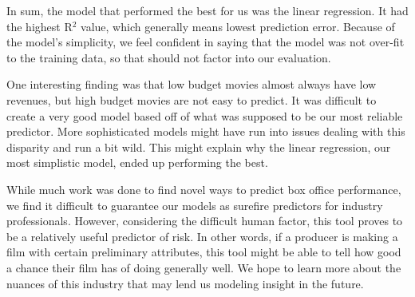 \documentclass{article}
\begin{document}
In sum, the model that performed the best for us was the linear regression. It had the highest R$^2$ value, which generally means lowest prediction error. Because of the model’s simplicity, we feel confident in saying that the model was not over-fit to the training data, so that should not factor into our evaluation.

One interesting finding was that low budget movies almost always have low revenues, but high budget movies are not easy to predict. It was difficult to create a very good model based off of what was supposed to be our most reliable predictor. More sophisticated models might have run into issues dealing with this disparity and run a bit wild. This might explain why the linear regression, our most simplistic model, ended up performing the best.

While much work was done to find novel ways to predict box office performance, we find it difficult to guarantee our models as surefire predictors for industry professionals. However, considering the difficult human factor, this tool proves to be a relatively useful predictor of risk. In other words, if a producer is making a film with certain preliminary attributes, this tool might be able to tell how good a chance their film has of doing generally well. We hope to learn more about the nuances of this industry that may lend us modeling insight in the future.
\end{document}
